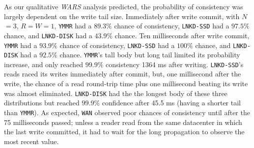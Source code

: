 \documentclass{vldb}
\begin{document}
As our qualitative \textit{WARS} analysis predicted, the probability
of consistency was largely dependent on the write tail size.
Immediately after write commit, with $N$$=$$3$, $R$$=$$W$$=$$1$,
\texttt{YMMR} had a $89.3\%$ chance of consistency, \texttt{LNKD-SSD}
had a $97.5\%$ chance, and \texttt{LNKD-DISK} had a $43.9\%$ chance.
Ten milliseconds after write commit, \texttt{YMMR} had a $93.9\%$
chance of consistency, \texttt{LNKD-SSD} had a $100\%$ chance, and
\texttt{LNKD-DISK} had a $92.5\%$ chance.  \texttt{YMMR}'s tall body
but long tail limited its probability increase, and only reached
$99.9\%$ consistency 1364 ms after writing.  \texttt{LNKD-SSD}'s reads
raced its writes immediately after commit, but, one millisecond after
the write, the chance of a read round-trip time plus one millisecond
beating its write was almost eliminated.  \texttt{LNKD-DISK} had the
the longest body of these three distributions but reached $99.9\%$
confidence after 45.5 ms (having a shorter tail than \texttt{YMMR}).  As
expected, \texttt{WAN} observed poor chances of consistency until
after the 75 milliseconds passed; unless a reader read from the same
datacenter in which the last write committed, it had to wait for the
long propagation to observe the most recent value.
\end{document}
